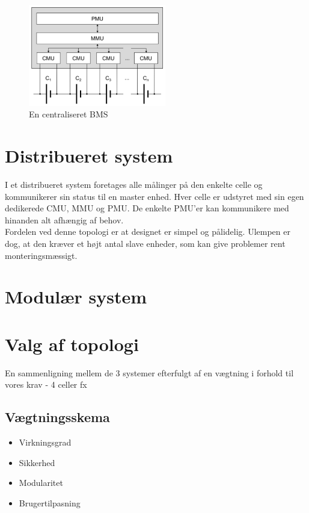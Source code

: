 \begin{figure}[h]
	\centering
	\includegraphics[width=6cm]{billeder/centralized.png}
	\caption{En centraliseret BMS}
	\label{fig:centralized_BMS}
\end{figure}

\section{Distribueret system}
I et distribueret system foretages alle målinger på den enkelte celle og kommunikerer sin status til en master enhed. Hver celle er udstyret med sin egen dedikerede CMU, MMU og PMU. De enkelte PMU'er kan kommunikere med hinanden alt afhængig af behov.
\\

Fordelen ved denne topologi er at designet er simpel og pålidelig. Ulempen er dog, at den kræver et højt antal slave enheder, som kan give problemer rent monteringsmæssigt.



\section{Modulær system}

\section{Valg af topologi}
En sammenligning mellem de 3 systemer efterfulgt af en vægtning i forhold til vores krav - 4 celler fx
\subsection{Vægtningsskema}

\begin{itemize}
	\item Virkningsgrad
	\item Sikkerhed
	\item Modularitet
	\item Brugertilpasning
\end{itemize}